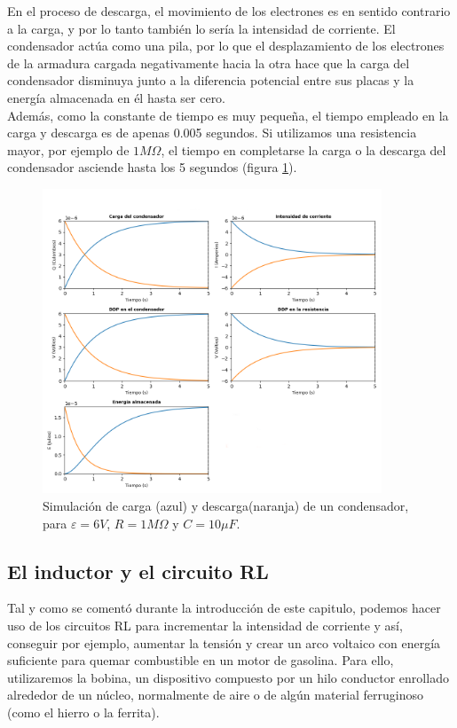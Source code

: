 \documentclass[../main.tex]{subfiles}
\begin{document}
En el proceso de descarga, el movimiento de los electrones es en sentido contrario a la carga, y por lo tanto también lo sería la intensidad de corriente. El condensador actúa como una pila, por lo que el desplazamiento de los electrones de la armadura cargada negativamente hacia la otra hace que la carga del condensador disminuya junto a la diferencia potencial entre sus placas y la energía almacenada en él hasta ser cero. \\

Además, como la constante de tiempo es muy pequeña, el tiempo empleado en la carga y descarga es de apenas 0.005 segundos. Si utilizamos una resistencia mayor, por ejemplo de $1M \Omega$, el tiempo en completarse la carga o la descarga del condensador asciende hasta los 5 segundos (figura \ref{fig::sim_ejemplo_rc2}).  


\begin{figure}[!h]
    \centering
    \includegraphics[width=0.9\textwidth]{images/resultados_ejemplo_circuitoRC2.png}
    \caption{Simulación de carga (azul) y descarga(naranja) de un condensador, para $\varepsilon=6V$, $R=1M \Omega$ y $C=10 \mu F$.}
    \label{fig::sim_ejemplo_rc2}
\end{figure}

\subsection{El inductor y el circuito RL}
Tal y como se comentó durante la introducción de este capitulo, podemos hacer uso de los circuitos RL para incrementar la intensidad de corriente y así, conseguir por ejemplo, aumentar la tensión y crear un arco voltaico con energía suficiente para quemar combustible en un motor de gasolina. Para ello, utilizaremos la bobina, un dispositivo compuesto por un hilo conductor enrollado alrededor de un núcleo, normalmente de aire o de algún material ferruginoso (como el hierro o la ferrita).\\ 
\end{document}
